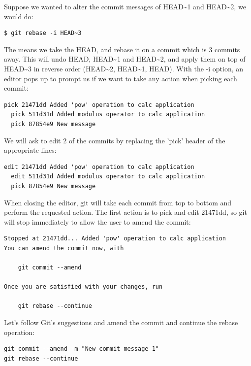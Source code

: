 \documentclass{../../common/tufte-latex/tufte-handout}
\begin{document}
Suppose we wanted to alter the commit messages of HEAD\textasciitilde1 and HEAD\textasciitilde2, we would do:
\begin{lstlisting}[style=BashInputStyle]
  $ git rebase -i HEAD~3
\end{lstlisting}

The means we take the HEAD, and rebase it on a commit which is 3 commits away.
This will undo HEAD, HEAD\textasciitilde1 and HEAD\textasciitilde2, and apply them on top of HEAD\textasciitilde3 in reverse order (HEAD\textasciitilde2, HEAD\textasciitilde1, HEAD). 
With the -i option, an editor pops up to prompt us if we want to take any action when picking each commit:

\begin{lstlisting}[style=BashInputStyle]
  pick 21471dd Added 'pow' operation to calc application
  pick 511d31d Added modulus operator to calc application
  pick 87854e9 New message
\end{lstlisting}

We will ask to edit 2 of the commits by replacing the 'pick' header of the appropriate lines:

\begin{lstlisting}[style=BashInputStyle]
  edit 21471dd Added 'pow' operation to calc application
  edit 511d31d Added modulus operator to calc application
  pick 87854e9 New message
\end{lstlisting}

When closing the editor, git will take each commit from top to bottom and perform the requested action.
The first action is to pick and edit 21471dd, so git will stop immediately to allow the user to amend the commit:

\begin{lstlisting}[style=BashInputStyle]
Stopped at 21471dd... Added 'pow' operation to calc application
You can amend the commit now, with

	git commit --amend

Once you are satisfied with your changes, run

	git rebase --continue
\end{lstlisting}

Let's follow Git's suggestions and amend the commit and continue the rebase operation:

\begin{lstlisting}[style=BashInputStyle]
git commit --amend -m "New commit message 1"
git rebase --continue
\end{lstlisting}
\end{document}
